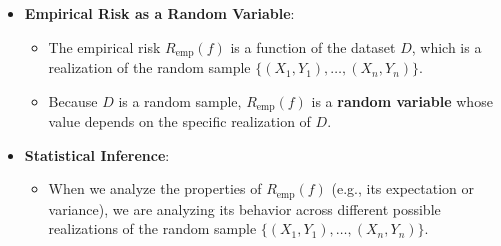 \begin{notechapter}
\begin{itemize}
    \item \textbf{Empirical Risk as a Random Variable}:
        \begin{itemize}
            \item The empirical risk \( R_{\text{emp}}(f) \) is a function of the dataset \( D \), which is a realization of the random sample \( \{(X_1, Y_1), \dots, (X_n, Y_n)\} \).
            \item Because \( D \) is a random sample, \( R_{\text{emp}}(f) \) is a \textbf{random variable} whose value depends on the specific realization of \( D \).
        \end{itemize}

    \item \textbf{Statistical Inference}:
        \begin{itemize}
            \item When we analyze the properties of \( R_{\text{emp}}(f) \) (e.g., its expectation or variance), we are analyzing its behavior across different possible realizations of the random sample \( \{(X_1, Y_1), \dots, (X_n, Y_n)\} \).
        \end{itemize}
\end{itemize}
\end{notechapter}

